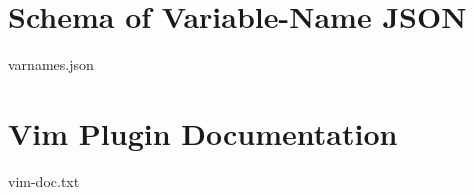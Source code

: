 \begin{appendices}
	\chapter{Schema of Variable-Name JSON}
	\label{appendix:schema}
	
		{varnames.json}
	\chapter{Vim Plugin Documentation}
	\label{appendix:vimplugindoc}
	
		{vim-doc.txt}

\end{appendices}
